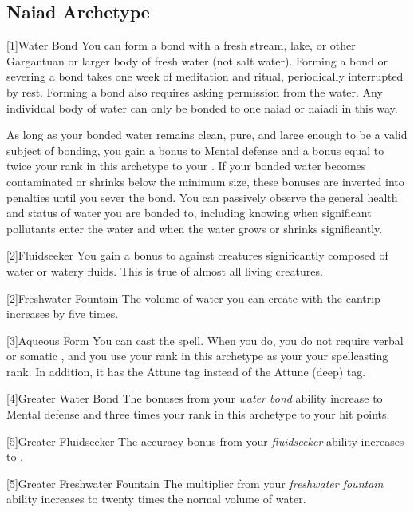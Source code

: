     \subsection{Naiad Archetype}

        [1]{Water Bond} You can form a bond with a fresh stream, lake, or other Gargantuan or larger body of fresh water (not salt water).
        Forming a bond or severing a bond takes one week of meditation and ritual, periodically interrupted by rest.
        Forming a bond also requires asking permission from the water.
        Any individual body of water can only be bonded to one naiad or naiadi in this way.

        As long as your bonded water remains clean, pure, and large enough to be a valid subject of bonding, you gain a  bonus to Mental defense and a bonus equal to twice your rank in this archetype to your .
        If your bonded water becomes contaminated or shrinks below the minimum size, these bonuses are inverted into penalties until you sever the bond.
        You can passively observe the general health and status of water you are bonded to, including knowing when significant pollutants enter the water and when the water grows or shrinks significantly.

        [2]{Fluidseeker} You gain a  bonus to  against creatures significantly composed of water or watery fluids.
        This is true of almost all living creatures.

        [2]{Freshwater Fountain} The volume of water you can create with the  cantrip increases by five times.

        [3]{Aqueous Form} You can cast the  spell.
        When you do, you do not require verbal or somatic , and you use your rank in this archetype as your your spellcasting rank.
        In addition, it has the Attune tag instead of the Attune (deep) tag.

        [4]{Greater Water Bond} The bonuses from your \textit{water bond} ability increase to  Mental defense and three times your rank in this archetype to your hit points.

        [5]{Greater Fluidseeker} The accuracy bonus from your \textit{fluidseeker} ability increases to .

        [5]{Greater Freshwater Fountain} The multiplier from your \textit{freshwater fountain} ability increases to twenty times the normal volume of water.


